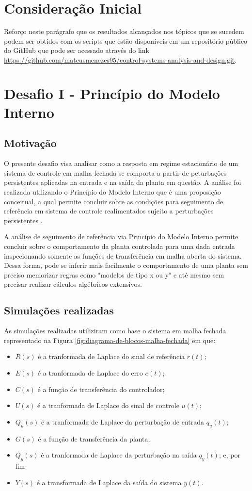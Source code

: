 \section{Consideração Inicial}
Reforço neste parágrafo que os resultados alcançados nos tópicos que se sucedem
podem ser obtidos com os scripts que estão disponíveis em um repositório público
do GitHub que pode ser acessado através do link
\url{https://github.com/mateusmenezes95/control-systems-analysis-and-design.git}.

\section{Desafio I - Princípio do Modelo Interno}

\subsection{Motivação}
O presente desafio visa analisar como a resposta em regime estacionário de um
sistema de controle em malha fechada se comporta a partir de peturbações
persistentes aplicadas na entrada e na saída da planta em questão. A análise foi
realizada utilizando o Princípio do Modelo Interno que é uma proposição
conceitual, a qual permite concluir sobre as condições para seguimento de
referência em sistema de controle realimentados sujeito a perturbações
persistentes \cite{Tito2021}.

A análise de seguimento de referência via Princípio do Modelo Interno permite
concluir sobre o comportamento da planta controlada para uma dada entrada
inspecionando somente as funções de transferência em malha aberta do sistema.
Dessa forma, pode se inferir mais facilmente o comportamento de uma planta sem
preciso memorizar regras como "modelos de tipo x ou y" e até mesmo sem precisar
realizar cálculos algébricos extensivos.

\subsection{Simulações realizadas}
\label{sec:desafio-1-simulacoes-realizadas}
As simulações realizadas utiliziram como base o sistema em malha fechada
representado na Figura \ref{fig:diagrama-de-blocos-malha-fechada} em que:
\begin{itemize}
    \item $R(s)$ é a tranformada de Laplace do sinal de referência $r(t)$;
    \item $E(s)$ é a tranformada de Laplace do erro $e(t)$;
    \item $C(s)$ é a função de transferência do controlador;
    \item $U(s)$ é a tranformada de Laplace do sinal de controle $u(t)$;
    \item $Q_{u}(s)$ é a tranformada de Laplace da perturbação de entrada
    $q_{u}(t)$;
    \item $G(s)$ é a função de transferência da planta;
    \item $Q_{y}(s)$ é a tranformada de Laplace da perturbação na saída
    $q_{y}(t)$; e, por fim
    \item $Y(s)$ é a transformada de Laplace da saída do sistema $y(t)$.
\end{itemize}

